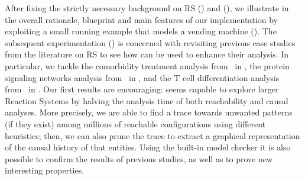 After fixing the strictly necessary background on RS () and \GROOVE (), we illustrate in  the overall rationale, blueprint and main features of our implementation  by exploiting a small running example that models a vending machine ().
The subsequent experimentation () is concerned with revisiting previous case studies from the literature on RS to see how \GROOVE can be used to enhance their analysis. 
In particular, we tackle 
the comorbidity treatment analysis from~\cite{DBLP:conf/cmsb/BowlesBBFGM24} in , 
the protein signaling networks analysis from~\cite{DBLP:conf/cmsb/BallisBFO24} in , and
the T cell differentiation analysis from~\cite{datamod2023} in .
Our first results are encouraging: \GROOVE seems capable to explore larger Reaction Systems 
by halving the analysis time of both reachability and causal analyses.
More precisely, we are able to find a trace towards unwanted patterns (if they exist) among millions of reachable configurations using different heuristics; then, we can also prune the trace to extract a graphical representation of the causal history of that entities. Using the built-in model checker it is also possible to confirm the results of previous studies, as well as to prove new interesting properties.


